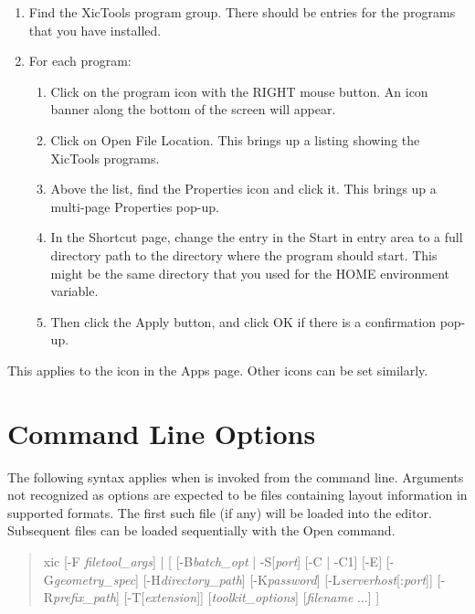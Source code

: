 \begin{itemize}
\begin{enumerate}
\item{Find the {\cb XicTools} program group.  There should be entries
for the programs that you have installed.}

\item{For each program:\\
\begin{enumerate}
  \item{Click on the program icon with the RIGHT mouse button.  An
  icon banner along the bottom of the screen will appear.}

  \item{Click on {\cb Open File Location}.  This brings up a listing
  showing the {\cb XicTools} programs.}

  \item{Above the list, find the {\cb Properties} icon and click it. 
  This brings up a multi-page {\cb Properties} pop-up.}

  \item{In the {\cb Shortcut} page, change the entry in the {\cb Start
  in} entry area to a full directory path to the directory where the
  program should start.  This might be the same directory that you
  used for the {\vt HOME} environment variable.}

  \item{Then click the {\cb Apply} button, and click {\cb OK} if there
  is a confirmation pop-up.}
\end{enumerate}
}
\end{enumerate}

This applies to the icon in the {\cb Apps} page.  Other icons can be
set similarly.


\section{Command Line Options}

The following syntax applies when {\Xic} is invoked from the command
line.  Arguments not recognized as options are expected to be files
containing layout information in supported formats.  The first such file
(if any) will be loaded into the editor.  Subsequent files can be loaded
sequentially with the {\cb Open} command.

\vspace*{5mm}
\begin{quote}\vt \rr
xic [-F {\it filetool\_args\/}] | [
  [-B{\it batch\_opt\/} | -S[{\it port\/}]
  [-C | -C1] [-E] [-G{\it geometry\_spec\/}]
  [-H{\it directory\_path}]
  \hspace*{1em}[-K{\it password}] [-L{\it serverhost\/}[:{\it port\/}]]
  [-R{\it prefix\_path\/}]
  [-T[{\it extension\/}]]
  [{\it toolkit\_options\/}]
  \hspace*{1em}[{\it filename} ...] ]
\end{quote}


\end{itemize}
